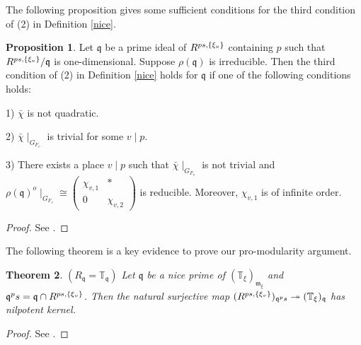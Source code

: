 \documentclass[12pt]{amsart}
\theoremstyle{plain}
\newtheorem{thm}{Theorem}[subsection]
\theoremstyle{definition}
\newtheorem{prop}[thm]{Proposition}
\theoremstyle{remark}
\begin{document}
The following proposition gives some sufficient conditions for the third condition of (2) in Definition \ref{nice}.

\begin{prop}\label{equiv}
	Let $\mathfrak{q}$ be a prime ideal of $ R^{\textnormal{ps}, \{\xi_v\}}$ containing $p$ such that $ R^{\textnormal{ps}, \{\xi_v\}}/\mathfrak{q}$ is one-dimensional. Suppose $\rho(\mathfrak{q})$ is irreducible. Then the third condition of (2) in Definition \ref{nice} holds for $\mathfrak{q}$ if one of the following conditions holds:
	
	1)  $\bar{\chi}$ is not quadratic. 
	
	2) $\bar{\chi}\mid_{G_{F_v}}$ is trivial for some $v \mid p$.
	
	3) There exists a place $v \mid p$ such that $\bar{\chi}\mid_{G_{F_v}}$ is not trivial and $\rho(\mathfrak{q})^o\mid_{G_{F_v}} \cong \begin{pmatrix}
		\chi_{v,1} & *\\
		0 & \chi_{v,2}
	\end{pmatrix}$ is reducible. Moreover, $ \chi_{v,1}$ is of infinite order.
\end{prop}

\begin{proof}
	See \cite[Lemma 4.1.6]{pan2022fontaine}.
\end{proof}

The following theorem is a key evidence to prove our  pro-modularity argument.

\begin{thm} \label{R=T}   $(R_{\mathfrak{q}}=\mathbb{T}_{\mathfrak{q}})$
	Let $\mathfrak{q} $ be a nice prime of $(\mathbb{T}_{\xi})_{\mathfrak{m}_{\xi}} $ and $\mathfrak{q}^\textnormal{ps}= \mathfrak{q} \cap R^{\textnormal{ps}, \{\xi_v\}}$. Then the natural surjective map $ (R^{\textnormal{ps}, \{\xi_v\}})_{\mathfrak{q}^\textnormal{ps}} \twoheadrightarrow (\mathbb{T}_{\xi})_{\mathfrak{q}}$ has nilpotent kernel.
	
\end{thm}

\begin{proof}
	See \cite[Section 4]{pan2022fontaine}.
\end{proof}
\end{document}
